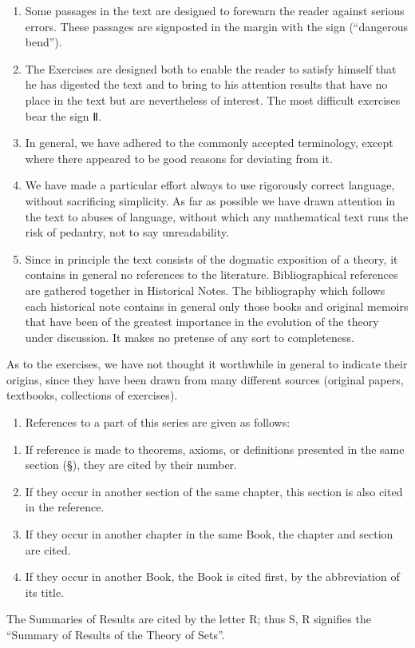 \begin{enumerate}
\def\labelenumi{\arabic{enumi}.}
\setcounter{enumi}{5}
\item
  Some passages in the text are designed to forewarn the reader against serious errors. These passages are signposted in the margin with the sign (``dangerous bend'').
\item
  The Exercises are designed both to enable the reader to satisfy himself that he has digested the text and to bring to his attention results that have no place in the text but are nevertheless of interest. The most difficult exercises bear the sign Ⅱ.
\item
  In general, we have adhered to the commonly accepted terminology, except where there appeared to be good reasons for deviating from it.
\item
  We have made a particular effort always to use rigorously correct language, without sacrificing simplicity. As far as possible we have drawn attention in the text to abuses of language, without which any mathematical text runs the risk of pedantry, not to say unreadability.
\item
  Since in principle the text consists of the dogmatic exposition of a theory, it contains in general no references to the literature. Bibliographical references are gathered together in Historical Notes. The bibliography which follows each historical note contains in general only those books and original memoirs that have been of the greatest importance in the evolution of the theory under discussion. It makes no pretense of any sort to completeness.
\end{enumerate}

As to the exercises, we have not thought it worthwhile in general to indicate their origins, since they have been drawn from many different sources (original papers, textbooks, collections of exercises).

\begin{enumerate}
\def\labelenumi{\arabic{enumi}.}
\setcounter{enumi}{10}
\tightlist
\item
  References to a part of this series are given as follows:
\end{enumerate}

\begin{enumerate}
\def\labelenumi{\alph{enumi})}
\item
  If reference is made to theorems, axioms, or definitions presented in the same section (§), they are cited by their number.
\item
  If they occur in another section of the same chapter, this section is also cited in the reference.
\item
  If they occur in another chapter in the same Book, the chapter and section are cited.
\item
  If they occur in another Book, the Book is cited first, by the abbreviation of its title.
\end{enumerate}

The Summaries of Results are cited by the letter R; thus S, R signifies the ``Summary of Results of the Theory of Sets''.

